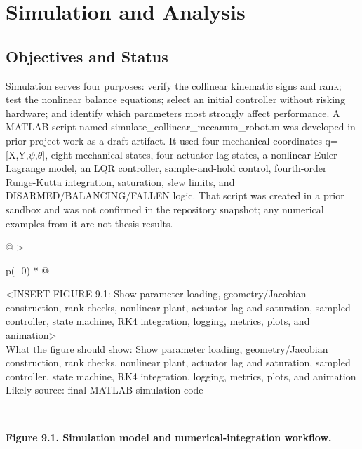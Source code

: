\chapter{Simulation and Analysis}\label{ch:simulation-and-analysis}

\section{Objectives and Status}\label{objectives-and-status}

Simulation serves four purposes: verify the collinear kinematic signs
and rank; test the nonlinear balance equations; select an initial
controller without risking hardware; and identify which parameters most
strongly affect performance. A MATLAB script named
simulate\_collinear\_mecanum\_robot.m was developed in prior project
work as a draft artifact. It used four mechanical coordinates
q=[X,Y,\ensuremath{\psi},\ensuremath{\theta}], eight mechanical states, four actuator-lag states, a
nonlinear Euler-Lagrange model, an LQR controller, sample-and-hold
control, fourth-order Runge-Kutta integration, saturation, slew limits,
and DISARMED\slash{}BALANCING\slash{}FALLEN logic. That script was created in a prior
sandbox and was not confirmed in the repository snapshot; any numerical
examples from it are not thesis results.

\begin{longtable}[]{@{}
  >{\raggedright\arraybackslash}p{(\columnwidth - 0\tabcolsep) * }@{}}
\toprule\noalign{}
\begin{minipage}[b]{\linewidth}\raggedright
\textless INSERT FIGURE 9.1: Show parameter loading, geometry\slash{}Jacobian
construction, rank checks, nonlinear plant, actuator lag and saturation,
sampled controller, state machine, RK4 integration, logging, metrics,
plots, and animation\textgreater{}\\
What the figure should show: Show parameter loading, geometry\slash{}Jacobian
construction, rank checks, nonlinear plant, actuator lag and saturation,
sampled controller, state machine, RK4 integration, logging, metrics,
plots, and animation\\
Likely source: final MATLAB simulation code\strut
\end{minipage} \\
\midrule\noalign{}
\endhead
\bottomrule\noalign{}
\endlastfoot
\end{longtable}

\begin{center}\singlespacing
{}
\textbf{Figure 9.1. Simulation model and numerical-integration workflow.}
\end{center}


